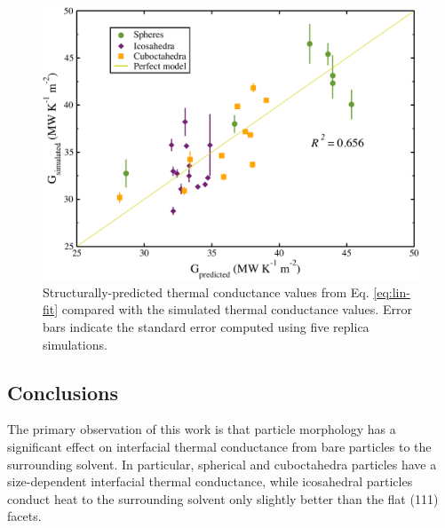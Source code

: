 \begin{figure}
\includegraphics[width=\linewidth]{figures/models.pdf}
 	\caption{Structurally-predicted thermal conductance values from Eq. \eqref{eq:lin-fit} compared with the simulated thermal conductance values. Error bars indicate the standard error computed using five replica simulations. }
    \label{fig:models}
\end{figure}





\subsection{Conclusions}
The primary observation of this work is that particle morphology has a
significant effect on interfacial thermal conductance from bare
particles to the surrounding solvent.  In particular, spherical and
cuboctahedra particles have a size-dependent interfacial thermal
conductance, while icosahedral particles conduct heat to the
surrounding solvent only slightly better than the flat (111) facets.

